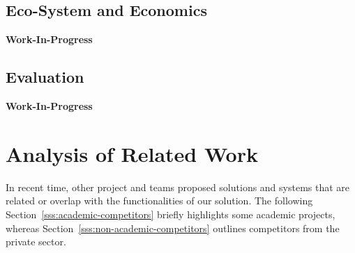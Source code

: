 \documentclass{llncs}
\begin{document}
{		\subsection{Eco-System and Economics}
		
			\textbf{Work-In-Progress}		
			
					
		
		\subsection{Evaluation}
			\label{ss:evaluation}				

			\textbf{Work-In-Progress}
			
					


	\section{Analysis of Related Work}
		\label{s:section-7}	
		

		
%							
		
		
			
		In recent time, other project and teams proposed solutions and systems that are related or overlap with the functionalities of our solution. The following Section~\ref{sss:academic-competitors} briefly highlights some academic projects, whereas Section~\ref{sss:non-academic-competitors} outlines competitors from the private sector.

}
\end{document}
